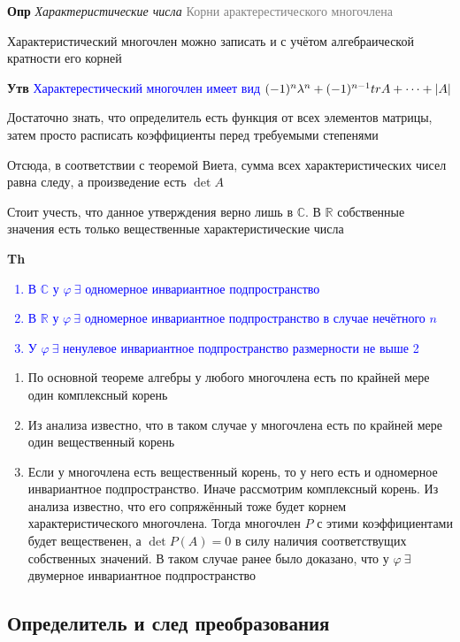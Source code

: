 \textbf{Опр} \textit{Характеристические числа} \textcolor{gray}{Корни арактерестического многочлена}

Характеристический многочлен можно записать и с учётом алгебраической кратности его корней

\textbf{Утв} \textcolor{blue}{Характерестический многочлен имеет
вид $(-1)^n \lambda^n + (-1)^{n-1} tr A + \dots + \abs{A}$}

Достаточно знать, что определитель есть функция от всех элементов матрицы, затем просто расписать коэффициенты
перед требуемыми степенями

Отсюда, в соответствии с теоремой Виета, сумма всех характеристических чисел равна следу, а произведение есть $\det A$


Стоит учесть, что данное утверждения верно лишь в $\mathbb{C}$.
В $\mathbb{R}$ собственные значения есть только вещественные характеристические числа

\textbf{Th} \textcolor{blue}{
    \begin{enumerate}
        \item В $\mathbb{C}$ у $\varphi~\exists$ одномерное инвариантное подпространство
        \item В $\mathbb{R}$ у $\varphi~\exists$ одномерное инвариантное подпространство в случае нечётного $n$
        \item У $\varphi~\exists$ ненулевое инвариантное подпространство размерности не выше 2
    \end{enumerate}         }

\begin{enumerate}
    \item По основной теореме алгебры у любого многочлена есть по крайней мере один комплексный корень
    \item Из анализа известно, что в таком случае у многочлена есть по крайней мере один вещественный корень
    \item Если у многочлена есть вещественный корень, то у него есть и одномерное инвариантное подпространство.
    Иначе рассмотрим комплексный корень.
    Из анализа известно, что его сопряжённый тоже будет корнем характеристического многочлена.
    Тогда многочлен $P$ с этими коэффициентами будет вещественен, а $\det P(A) = 0$ в силу наличия соответствущих
    собственных значений.
    В таком случае ранее было доказано, что у $\varphi~\exists$ двумерное инвариантное подпространство
\end{enumerate}

\subsection{Определитель и след преобразования}

